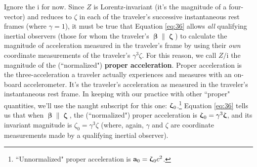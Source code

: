 \documentclass[12pt]{article}
\renewcommand{\vv}[1]{\mathbf{#1}}
\newcommand{\vvbeta}{\bm{\upbeta}}
\newcommand{\vvzeta}{\bm{\upzeta}}
\begin{document}
Ignore the $\mathrm{i}$ for now. Since $Z$ is Lorentz-invariant (it's the magnitude of a four-vector) and reduces to $\zeta$ in each of the traveler's successive instantaneous rest frames (where $\gamma = 1$), it must be true that Equation \ref{eq:36} allows \emph{all} qualifying inertial observers (those for whom the traveler's $\vvbeta \parallel \vvzeta$) to calculate the magnitude of acceleration measured in the traveler's frame by using their \emph{own} coordinate measurements of the traveler's $\gamma^3 \zeta$. For this reason, we call $Z / \mathrm{i}$ the magnitude of the (``normalized") \textbf{proper acceleration}. Proper acceleration is the three-acceleration a traveler actually experiences and measures with an on-board accelerometer. It's the traveler's acceleration as measured in the traveler's instantaneous rest frame. In keeping with our practice with other ``proper" quantities, we'll use the naught subscript for this one: $\vvzeta_{\mkern1mu 0}$.\footnote{``Unnormalized" proper acceleration is $\vv a_0 = \vvzeta_{\mkern1mu 0} c^2$.} Equation \ref{eq:36} tells us that when $\vvbeta \parallel \vvzeta$, the (``normalized") proper acceleration is $\vvzeta_{\mkern1mu 0} = \gamma^3 \vvzeta$, and its invariant magnitude is $\zeta_0 = \gamma^3 \zeta$ (where, again, $\gamma$ and $\zeta$ are coordinate measurements made by a qualifying inertial observer).
\end{document}
